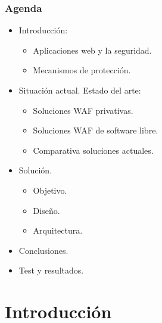 \begin{frame}[shrink=20]
  \frametitle{Agenda}
  \begin{itemize}
    \item Introducción:
      \begin{itemize}
        \item Aplicaciones web y la seguridad.
        \item Mecanismos de protección.
      \end{itemize}
    \item Situación actual. Estado del arte:
      \begin{itemize}
        \item Soluciones WAF privativas.
        \item Soluciones WAF de software libre.
        \item Comparativa soluciones actuales.
      \end{itemize}
    \item Solución.
      \begin{itemize}
        \item Objetivo.
        \item Diseño.
        \item Arquitectura.
      \end{itemize}
    \item Conclusiones.
    \item Test y resultados.
  \end{itemize}
\end{frame}

\section{Introducción}
